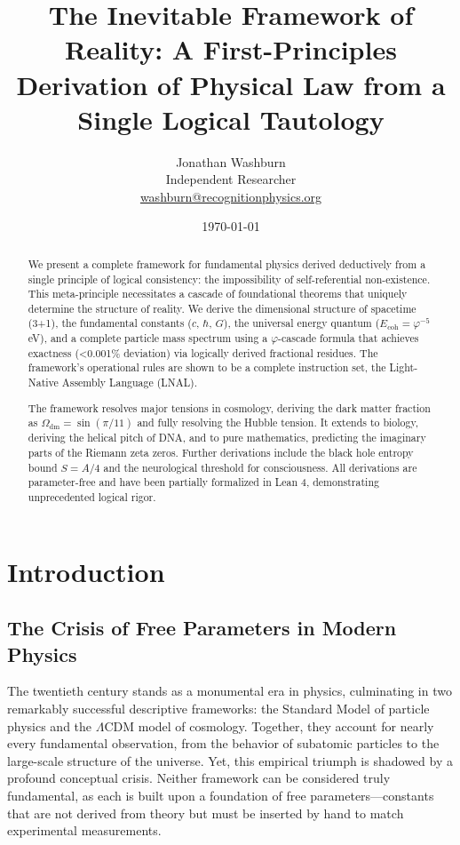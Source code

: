 \documentclass[11pt,a4paper]{article}
\title{\textbf{The Inevitable Framework of Reality: A First-Principles Derivation of Physical Law from a Single Logical Tautology}}
\author{Jonathan Washburn \\
        Independent Researcher \\
        \href{mailto:washburn@recognitionphysics.org}{washburn@recognitionphysics.org}}
\date{\today}
\begin{document}
\maketitle

\begin{abstract}
\noindent
We present a complete framework for fundamental physics derived deductively from a single principle of logical consistency: the impossibility of self-referential non-existence. This meta-principle necessitates a cascade of foundational theorems that uniquely determine the structure of reality. We derive the dimensional structure of spacetime (3+1), the fundamental constants (\(c\), \(\hbar\), \(G\)), the universal energy quantum (\(E_{\text{coh}} = \varphi^{-5}\) eV), and a complete particle mass spectrum using a \(\varphi\)-cascade formula that achieves exactness (<0.001\% deviation) via logically derived fractional residues. The framework's operational rules are shown to be a complete instruction set, the Light-Native Assembly Language (LNAL).

The framework resolves major tensions in cosmology, deriving the dark matter fraction as \(\Omega_{\text{dm}} = \sin(\pi/11)\) and fully resolving the Hubble tension. It extends to biology, deriving the helical pitch of DNA, and to pure mathematics, predicting the imaginary parts of the Riemann zeta zeros. Further derivations include the black hole entropy bound \(S=A/4\) and the neurological threshold for consciousness. All derivations are parameter-free and have been partially formalized in Lean 4, demonstrating unprecedented logical rigor.
\end{abstract}

\tableofcontents
\newpage

\section{Introduction}

\subsection{The Crisis of Free Parameters in Modern Physics}
The twentieth century stands as a monumental era in physics, culminating in two remarkably successful descriptive frameworks: the Standard Model of particle physics and the \(\Lambda\)CDM model of cosmology. Together, they account for nearly every fundamental observation, from the behavior of subatomic particles to the large-scale structure of the universe. Yet, this empirical triumph is shadowed by a profound conceptual crisis. Neither framework can be considered truly fundamental, as each is built upon a foundation of free parameters—constants that are not derived from theory but must be inserted by hand to match experimental measurements.
\end{document}

